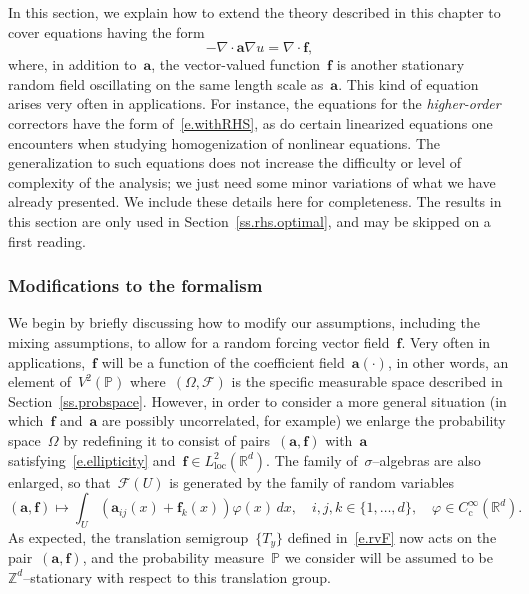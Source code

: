 \documentclass[11pt,twoside]{article} %
\numberwithin{equation}{section}
\theoremstyle{definition}
\newcommand*{\Zd}{\ensuremath{\mathbb{Z}^d}}
\newcommand*{\Rd}{\ensuremath{\mathbb{R}^d}}
\newcommand{\f}{\mathbf{f}}
\renewcommand{\a}{\mathbf{a}}
\newcommand{\F}{\mathcal{F}}
\renewcommand{\P}{\mathbb{P}}
\begin{document}
In this section, we explain how to extend the theory described in this chapter to cover equations having the form 
\begin{equation}
\label{e.withRHS}
-\nabla \cdot \a \nabla u = \nabla\cdot \f,
\end{equation}
where, in addition to~$\a$, the vector-valued function~$\f$ is another stationary random field oscillating on the same length scale as~$\a$. 
This kind of equation arises very often in applications. For instance, the equations for the \emph{higher-order} correctors have the form of~\eqref{e.withRHS}, as do certain linearized equations one encounters when studying homogenization of nonlinear equations. 
The generalization to such equations does not increase the difficulty or level of complexity of the analysis; we just need some minor variations of what we have already presented. We include these details here for completeness. The results in this section are only used in Section~\ref{ss.rhs.optimal}, and may be skipped on a first reading. 

\subsubsection{Modifications to the formalism}
\label{sss.formalisms.for.RHS}

We begin by briefly discussing how to modify our assumptions, including the mixing assumptions, to allow for a random forcing vector field~$\f$. Very often in applications,~$\f$ will be a function of the coefficient field~$\a(\cdot)$, in other words, an element of~$V^2(\P)$ where~$(\Omega,\F)$ is the specific measurable space described in Section~\ref{ss.probspace}. 
However, in order to consider a more general situation (in which~$\f$ and~$\a$ are possibly uncorrelated, for example) we enlarge the probability space~$\Omega$ by redefining it to consist of pairs~$(\a,\f)$ with~$\a$ satisfying~\eqref{e.ellipticity} and~$\f\in L^2_{\mathrm{loc}}(\Rd)$. The family of~$\sigma$--algebras are also enlarged, so that~$\F(U)$ is generated by the family of random variables 
\begin{equation*} \label{}
(\a,\f) \mapsto \int_U ( \a_{ij} (x) + \f_k(x))  \varphi(x)\,dx, 
\quad 
i,j,k \in\{1,\ldots,d\}, 
\quad 
\varphi\in C^\infty_{\mathrm{c}}(\Rd). 
\end{equation*}
As expected, the translation semigroup~$\{ T_y \}$ defined in~\eqref{e.rvF} now acts on the pair~$(\a,\f)$, and the probability measure~$\P$ we consider will be assumed to be~$\Zd$--stationary with respect to this translation group. 
\end{document}

